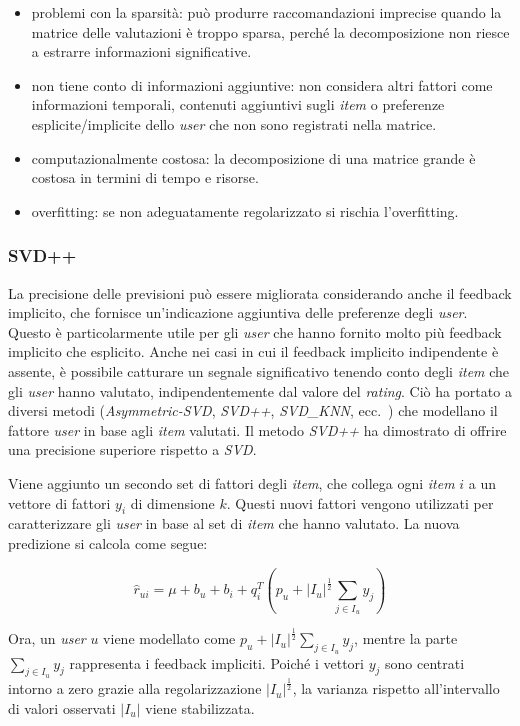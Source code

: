 \begin{itemize}
    \item problemi con la sparsità: può produrre raccomandazioni imprecise quando la matrice delle valutazioni è troppo sparsa, perché la decomposizione non riesce a estrarre informazioni significative. 
    \item non tiene conto di informazioni aggiuntive: non considera altri fattori come informazioni temporali, contenuti aggiuntivi sugli \textit{item} o preferenze esplicite/implicite dello \textit{user} che non sono registrati nella matrice.
    \item computazionalmente costosa: la decomposizione di una matrice grande è costosa in termini di tempo e risorse.
    \item overfitting: se non adeguatamente regolarizzato si rischia l'overfitting.
\end{itemize}

\subsubsection{SVD\protect++}

La precisione delle previsioni può essere migliorata considerando anche il feedback implicito, che fornisce un'indicazione aggiuntiva delle preferenze degli \textit{user}. Questo è particolarmente utile per gli \textit{user} che hanno fornito molto più feedback implicito che esplicito. Anche nei casi in cui il feedback implicito indipendente è assente, è possibile catturare un segnale significativo tenendo conto degli \textit{item} che gli \textit{user} hanno valutato, indipendentemente dal valore del \textit{rating}. Ciò ha portato a diversi metodi (\textit{Asymmetric-SVD}, \textit{SVD++}, \textit{SVD\_KNN}, ecc.~\cite{SVD++, SVD_KNN}) che modellano il fattore \textit{user} in base agli \textit{item} valutati. Il metodo \textit{SVD++} ha dimostrato di offrire una precisione superiore rispetto a \textit{SVD}.

Viene aggiunto un secondo set di fattori degli \textit{item}, che collega ogni \textit{item} $i$ a un vettore di fattori $y_i$ di dimensione $k$. Questi nuovi fattori vengono utilizzati per caratterizzare gli \textit{user} in base al set di \textit{item} che hanno valutato. La nuova predizione si calcola come segue:

\[
\hat{r}_{ui} = \mu + b_u + b_i + q_i^T \left(p_u + |I_u|^{\frac{1}{2}} \sum\limits_{j \in I_u} y_j \right)
\]

Ora, un \textit{user} $u$ viene modellato come $p_u + |I_u|^{\frac{1}{2}} \sum\limits_{j \in I_u} y_j$, mentre la parte $\sum\limits_{j \in I_u} y_j$ rappresenta i feedback impliciti. Poiché i vettori $y_j$ sono centrati intorno a zero grazie alla regolarizzazione $|I_u|^{\frac{1}{2}}$, la varianza rispetto all'intervallo di valori osservati $|I_u|$ viene stabilizzata.

